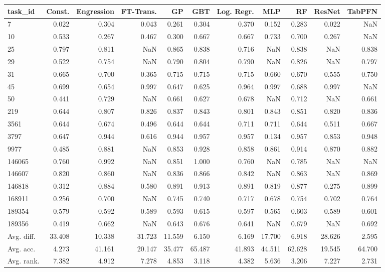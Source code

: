 \begin{tabular}{lrrrrrrrrrr}
\toprule
task\_id & Const. & Engression & FT-Trans. & GP & GBT & Log. Regr. & MLP & RF & ResNet & TabPFN \\
\midrule
7 & 0.022 & 0.304 & 0.043 & 0.261 & 0.304 & 0.370 & 0.152 & 0.283 & 0.022 & NaN \\
10 & 0.533 & 0.267 & 0.467 & 0.300 & 0.667 & 0.667 & 0.733 & 0.700 & 0.267 & NaN \\
25 & 0.797 & 0.811 & NaN & 0.865 & 0.838 & 0.716 & NaN & 0.838 & NaN & 0.838 \\
29 & 0.522 & 0.754 & NaN & 0.790 & 0.804 & 0.790 & NaN & 0.826 & NaN & 0.797 \\
31 & 0.665 & 0.700 & 0.365 & 0.715 & 0.715 & 0.715 & 0.660 & 0.670 & 0.555 & 0.750 \\
45 & 0.699 & 0.654 & 0.997 & 0.647 & 0.625 & 0.964 & 0.997 & 0.688 & 0.997 & NaN \\
50 & 0.441 & 0.729 & NaN & 0.661 & 0.627 & 0.678 & NaN & 0.712 & NaN & 0.661 \\
219 & 0.644 & 0.807 & 0.826 & 0.837 & 0.843 & 0.801 & 0.843 & 0.851 & 0.820 & 0.836 \\
3561 & 0.644 & 0.674 & 0.496 & 0.644 & 0.644 & 0.711 & 0.711 & 0.644 & 0.511 & 0.667 \\
3797 & 0.647 & 0.944 & 0.616 & 0.944 & 0.957 & 0.957 & 0.134 & 0.957 & 0.853 & 0.948 \\
9977 & 0.485 & 0.881 & NaN & 0.853 & 0.928 & 0.858 & 0.861 & 0.914 & 0.870 & 0.882 \\
146065 & 0.760 & 0.992 & NaN & 0.851 & 1.000 & 0.760 & NaN & 0.785 & NaN & NaN \\
146607 & 0.820 & 0.860 & NaN & 0.836 & 0.866 & 0.842 & NaN & 0.863 & NaN & 0.869 \\
146818 & 0.312 & 0.884 & 0.580 & 0.891 & 0.913 & 0.891 & 0.819 & 0.877 & 0.275 & 0.899 \\
168911 & 0.256 & 0.700 & NaN & 0.745 & 0.740 & 0.717 & 0.678 & 0.754 & 0.702 & 0.764 \\
189354 & 0.579 & 0.592 & 0.589 & 0.593 & 0.615 & 0.597 & 0.565 & 0.603 & 0.589 & 0.601 \\
189356 & 0.419 & 0.662 & NaN & 0.643 & 0.676 & 0.641 & NaN & 0.679 & NaN & 0.692 \\
Avg. diff. & 33.408 & 10.338 & 31.723 & 11.559 & 6.150 & 6.169 & 17.700 & 6.918 & 28.626 & 2.595 \\
Avg. acc. & 4.273 & 41.161 & 20.147 & 35.477 & 65.487 & 41.893 & 44.511 & 62.628 & 19.545 & 64.700 \\
Avg. rank. & 7.382 & 4.912 & 7.278 & 4.853 & 3.118 & 4.382 & 5.636 & 3.206 & 7.227 & 2.731 \\
\bottomrule
\end{tabular}
